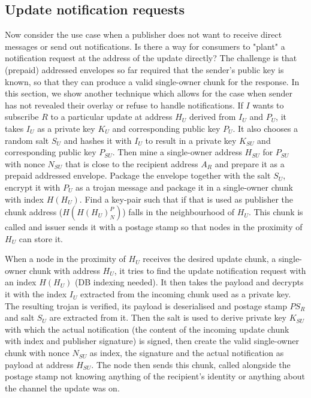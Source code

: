 \subsection{Update notification requests}\label{sec:update-notification-requests} 

Now consider the use case when a publisher does not want to receive direct messages or send out notifications. Is there a way for consumers to "plant" a notification request at the address of the update directly? The challenge is that (prepaid) addressed envelopes so far required that the sender's public key is known, so that they can produce a valid single-owner chunk for the response. 
In this section, we show another technique which allows for the case when sender has not revealed their overlay or refuse to handle notifications.                                                                                                                                                                                                                                                             
If $I$  wants to subscribe $R$ to a  particular update at address $H_U$ derived from $I_U$ and $P_U$, it takes $I_U$ as a private key $K_U$ and corresponding public key $P_U$. It also chooses a random salt $S_U$ and hashes it with $I_U$ to result in a private key $K_{SU}$ and corresponding public key $P_{SU}$. Then mine a single-owner address $H_{SU}$ for $P_{SU}$ with nonce $N_{SU}$ that is close to the recipient address $A_R$ and prepare it as a prepaid addressed envelope. Package the envelope together with the salt $S_U$, encrypt it with $P_U$ as a trojan message and
package it in a single-owner chunk with index $H(H_U)$. Find a key-pair such that if that is used as publisher the chunk address ($H(H(H_U)^P_N)$) falls in the neighbourhood of $H_U$. This chunk is called  and issuer sends it with a postage stamp so that nodes in the proximity of $H_U$ can store it.

When a node in the proximity of $H_U$ receives the desired update chunk, a single-owner chunk with address $H_U$, it tries to find the update notification request with an index $H(H_U)$ (DB indexing needed). It then takes the payload and decrypts it with the index $I_U$ extracted from the incoming chunk used as a private key. The resulting trojan is verified, its payload is deserialised and postage stamp $PS_R$ and salt $S_U$ are extracted from it. Then the salt is used to derive private key $K_{SU}$ with which the actual notification (the content of the incoming update chunk with index and publisher signature) is signed, then create the valid single-owner chunk with nonce $N_{SU}$ as index, the signature and the actual notification as payload at address $H_{SU}$. The node then sends this chunk, called  alongside the postage stamp not knowing anything of the recipient's identity or anything about the channel the update was on.

